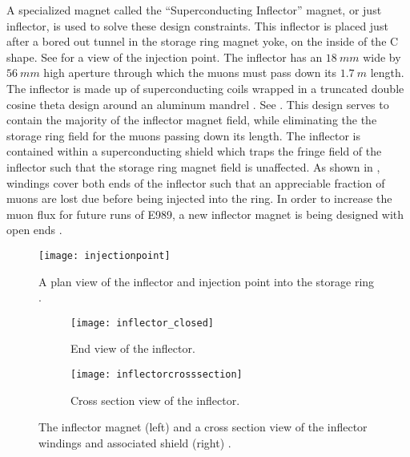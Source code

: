 A specialized magnet called the ``Superconducting Inflector'' magnet, or just inflector, is used to solve these design constraints. This inflector is placed just after a bored out tunnel in the storage ring magnet yoke, on the inside of the C shape. See  for a view of the injection point. The inflector has an $\SI{18}{mm}$ wide by $\SI{56}{mm}$ high aperture through which the muons must pass down its $\SI{1.7}{m}$ length. The inflector is made up of superconducting coils wrapped in a truncated double cosine theta design around an aluminum mandrel \cite{inflector}. See . This design serves to contain the majority of the inflector magnet field, while eliminating the the storage ring field for the muons passing down its length. The inflector is contained within a superconducting shield which traps the fringe field of the inflector such that the storage ring magnet field is unaffected. As shown in , windings cover both ends of the inflector such that an appreciable fraction of muons are lost due before being injected into the ring. In order to increase the muon flux for future runs of E989, a new inflector magnet is being designed with open ends \cite{TDR}.


\begin{figure}[]
    \centering
    \texttt{[image: injectionpoint]}
    \caption[Muon injection point through inflector]{A plan view of the inflector and injection point into the storage ring \cite{inflector}.}   
    \label{fig:injectionpoint}
\end{figure}

\begin{figure}[]
\centering
    \begin{subfigure}[t]{0.45\textwidth}
        \centering
        \texttt{[image: inflector\_closed]}
        \caption{End view of the inflector.}
    \end{subfigure}%
    \hspace{1cm}
    \begin{subfigure}[t]{0.45\textwidth}
        \centering
        \texttt{[image: inflectorcrosssection]}
        \caption{Cross section view of the inflector.}
    \end{subfigure}
\caption[Superconducting inflector magnet]{The inflector magnet (left) and a cross section view of the inflector windings and associated shield (right) \cite{inflector}.}
\label{fig:inflector}
\end{figure}



